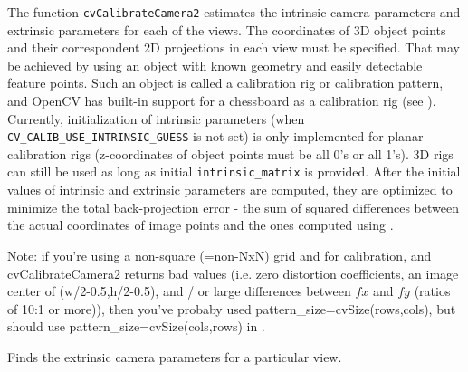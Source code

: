 The function \texttt{cvCalibrateCamera2} estimates the intrinsic camera
parameters and extrinsic parameters for each of the views. The
coordinates of 3D object points and their correspondent 2D projections
in each view must be specified. That may be achieved by using an
object with known geometry and easily detectable feature points.
Such an object is called a calibration rig or calibration pattern,
and OpenCV has built-in support for a chessboard as a calibration
rig (see ). Currently, initialization
of intrinsic parameters (when \texttt{CV\_CALIB\_USE\_INTRINSIC\_GUESS}
is not set) is only implemented for planar calibration rigs
(z-coordinates of object points must be all 0's or all 1's). 3D
rigs can still be used as long as initial \texttt{intrinsic\_matrix}
is provided. After the initial values of intrinsic and extrinsic
parameters are computed, they are optimized to minimize the total
back-projection error - the sum of squared differences between the
actual coordinates of image points and the ones computed using
.

Note: if you're using a non-square (=non-NxN) grid and
 for calibration, and cvCalibrateCamera2 returns
bad values (i.e. zero distortion coefficients, an image center of
(w/2-0.5,h/2-0.5), and / or large differences between $fx$ and $fy$ (ratios of
10:1 or more)), then you've probaby  used pattern\_size=cvSize(rows,cols),
but should use pattern\_size=cvSize(cols,rows) in .

\label{FindExtrinsicCameraParams2}

Finds the extrinsic camera parameters for a particular view.


\begin{description}
\end{description}

